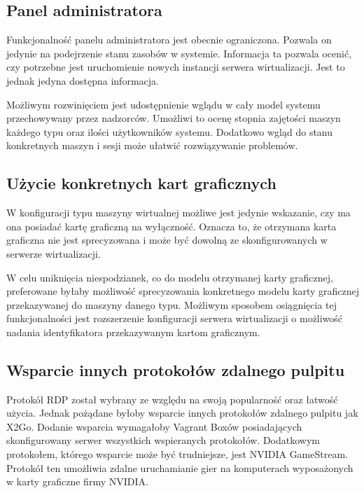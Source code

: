 \documentclass[../podsumowanie.tex]{subfiles}
\begin{document}
\label{future_directions}

\subsection{Panel administratora}

Funkcjonalność panelu administratora jest obecnie ograniczona. Pozwala on jedynie na podejrzenie stanu zasobów w systemie. Informacja ta pozwala ocenić, czy potrzebne jest uruchomienie nowych instancji serwera wirtualizacji. Jest to jednak jedyna dostępna informacja.

Możliwym rozwinięciem jest udostępnienie wglądu w cały model systemu przechowywany przez nadzorców. Umożliwi to ocenę stopnia zajętości maszyn każdego typu oraz ilości użytkowników systemu. Dodatkowo wgląd do stanu konkretnych maszyn i sesji może ułatwić rozwiązywanie problemów.

\subsection{Użycie konkretnych kart graficznych}

W konfiguracji typu maszyny wirtualnej możliwe jest jedynie wskazanie, czy ma ona posiadać kartę graficzną na wyłączność. Oznacza to, że otrzymana karta graficzna nie jest sprecyzowana i może być dowolną ze skonfigurowanych w serwerze wirtualizacji.

W celu uniknięcia niespodzianek, co do modelu otrzymanej karty graficznej, preferowane byłaby możliwość sprecyzowania konkretnego modelu karty graficznej przekazywanej do maszyny danego typu. Możliwym sposobem osiągnięcia tej funkcjonalności jest rozszerzenie konfiguracji serwera wirtualizacji o możliwość nadania identyfikatora przekazywanym kartom graficznym.

\subsection{Wsparcie innych protokołów zdalnego pulpitu}

Protokół RDP został wybrany ze względu na swoją popularność oraz łatwość użycia. Jednak pożądane byłoby wsparcie innych protokołów zdalnego pulpitu jak X2Go. %
Dodanie wsparcia wymagałoby Vagrant Boxów posiadających skonfigurowany serwer wszystkich wspieranych protokołów. Dodatkowym protokołem, którego wsparcie może być trudniejsze, jest NVIDIA GameStream. %
Protokół ten umożliwia zdalne uruchamianie gier na komputerach wyposażonych w karty graficzne firmy NVIDIA.
\end{document}
